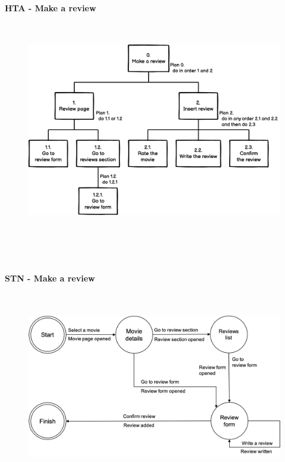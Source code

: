\documentclass[12pt, a4paper]{article}
\begin{document}
\paragraph{HTA - Make a review}\mbox{}\\
\begin{figure}[H]
	\centering
	\includegraphics[width=1\textwidth]{images/Make a review HTA.png}\\
\end{figure}
\mbox{}\\\\\\
\paragraph{STN - Make a review}\mbox{}\\
\begin{figure}[H]
	\centering
	\includegraphics[width=1\textwidth]{images/MakeAReviewSTN.png}\\
\end{figure}
\end{document}
